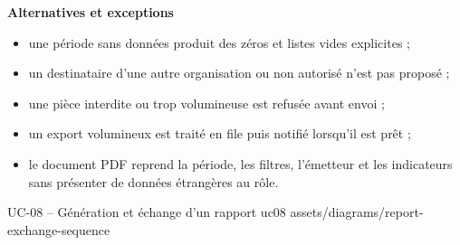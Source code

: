 \textbf{Alternatives et exceptions}
\begin{itemize}[leftmargin=7mm]
  \item une période sans données produit des zéros et listes vides explicites ;
  \item un destinataire d'une autre organisation ou non autorisé n'est pas proposé ;
  \item une pièce interdite ou trop volumineuse est refusée avant envoi ;
  \item un export volumineux est traité en file puis notifié lorsqu'il est prêt ;
  \item le document PDF reprend la période, les filtres, l'émetteur et les indicateurs
  sans présenter de données étrangères au rôle.
\end{itemize}

\UseCaseUmlPlate
  {UC-08 -- Génération et échange d'un rapport}
  {uc08}
  {assets/diagrams/report-exchange-sequence}

